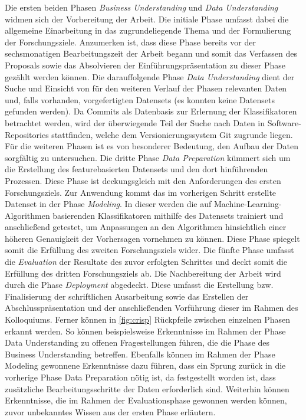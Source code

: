 Die ersten beiden Phasen \emph{Business Understanding} und \emph{Data Understanding} widmen sich der Vorbereitung der Arbeit. Die initiale Phase umfasst dabei die allgemeine Einarbeitung in das zugrundeliegende Thema und der Formulierung der Forschungsziele. Anzumerken ist, dass diese Phase bereits vor der sechsmonatigen Bearbeitungszeit der Arbeit begann und somit das Verfassen des Proposals sowie das Absolvieren der Einführungspräsentation zu dieser Phase gezählt werden können. Die darauffolgende Phase \emph{Data Understanding} dient der Suche und Einsicht von für den weiteren Verlauf der Phasen relevanten Daten und, falls vorhanden, vorgefertigten Datensets (es konnten keine Datensets gefunden werden). Da Commits als Datenbasis zur Erlernung der Klassifikatoren betrachtet werden, wird der überwiegende Teil der Suche nach Daten in Software-Repositories stattfinden, welche dem Versionierungssystem Git zugrunde liegen. Für die weiteren Phasen ist es von besonderer Bedeutung, den Aufbau der Daten sorgfältig zu untersuchen. Die dritte Phase \emph{Data Preparation} kümmert sich um die Erstellung des featurebasierten Datensets und den dort hinführenden Prozessen. Diese Phase ist deckungsgleich mit den Anforderungen des ersten Forschungsziels. Zur Anwendung kommt das im vorherigen Schritt erstellte Datenset in der Phase \emph{Modeling}. In dieser werden die auf Machine-Learning-Algorithmen basierenden Klassifikatoren mithilfe des Datensets trainiert und anschließend getestet, um Anpassungen an den Algorithmen hinsichtlich einer höheren Genauigkeit der Vorhersagen vornehmen zu können. Diese Phase spiegelt somit die Erfüllung des zweiten Forschungsziels wider. Die fünfte Phase umfasst die \emph{Evaluation} der Resultate des zuvor erfolgten Schrittes und deckt somit die Erfüllung des dritten Forschungsziels ab. Die Nachbereitung der Arbeit wird durch die Phase \emph{Deployment} abgedeckt. Diese umfasst die Erstellung bzw. Finalisierung der schriftlichen Ausarbeitung sowie das Erstellen der Abschlusspräsentation und der anschließenden Vorführung dieser im Rahmen des Kolloquiums.
Ferner können in \autoref{fig:crisp} Rückpfeile zwischen einzelnen Phasen erkannt werden. So können beispielsweise Erkenntnisse im Rahmen der Phase Data Understanding zu offenen Fragestellungen führen, die die Phase des Business Understanding betreffen. Ebenfalls können im Rahmen der Phase Modeling gewonnene Erkenntnisse dazu führen, dass ein Sprung zurück in die vorherige Phase Data Preparation nötig ist, da festgestellt worden ist, dass zusätzliche Bearbeitungsschritte der Daten erforderlich sind. Weiterhin können Erkenntnisse, die im Rahmen der Evaluationsphase gewonnen werden können, zuvor unbekanntes Wissen aus der ersten Phase erläutern.


